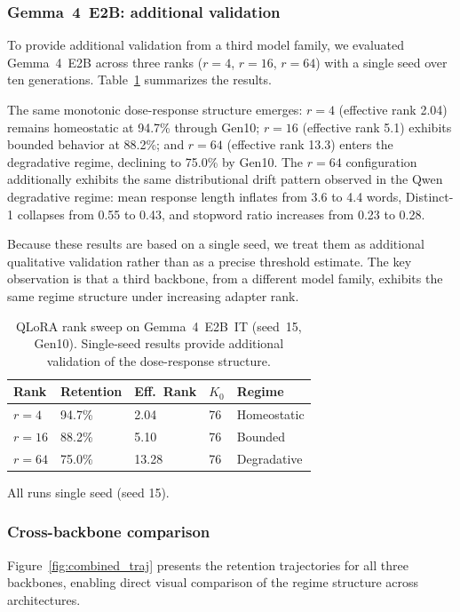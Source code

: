 \documentclass[a4paper,fleqn]{cas-dc}
\newif\ifshowchanges
\newcommand{\rev}[1]{\ifshowchanges{\color{blue}#1}\else{#1}\fi}
\begin{document}
\subsubsection{Gemma~4~E2B: additional validation}

To provide additional validation from a third model family, we evaluated
Gemma~4~E2B across three ranks ($r=4$, $r=16$, $r=64$) with a single seed
over ten generations. Table~\ref{tab:gemma4} summarizes the results.

The same monotonic dose-response structure emerges: $r=4$ (effective rank 2.04)
remains homeostatic at 94.7\% through Gen10; $r=16$ (effective rank 5.1)
exhibits bounded behavior at 88.2\%; and $r=64$ (effective rank 13.3)
enters the degradative regime, declining to 75.0\% by Gen10. The $r=64$
configuration additionally exhibits the same distributional drift pattern
observed in the Qwen degradative regime: mean response length inflates from
3.6 to 4.4 words, Distinct-1 collapses from 0.55 to 0.43, and stopword ratio
increases from 0.23 to 0.28.

Because these results are based on a single seed, we treat them as additional
qualitative validation rather than as a precise threshold estimate. The key
observation is that a third backbone, from a different model family, exhibits
the same regime structure under increasing adapter rank.

\begin{table}[width=.95\linewidth,cols=5,pos=htbp]
\caption{QLoRA rank sweep on Gemma~4~E2B~IT (seed~15, Gen10). Single-seed
results provide additional validation of the dose-response
structure.}\label{tab:gemma4}
\begin{tabular*}{\tblwidth}{@{} lllll@{} }
\toprule
Rank & Retention & Eff.\ Rank & $K_0$ & Regime \\
\midrule
$r=4$   & 94.7\% & 2.04  & 76 & Homeostatic \\
$r=16$  & 88.2\% & 5.10  & 76 & Bounded \\
$r=64$  & 75.0\% & 13.28 & 76 & Degradative \\
\bottomrule
\end{tabular*}
\rev{{\footnotesize All runs single seed (seed 15).}}
\end{table}

\subsubsection{Cross-backbone comparison}

Figure~\ref{fig:combined_traj} presents the retention trajectories for all three
backbones, enabling direct visual comparison of the regime structure across
architectures.
\end{document}
